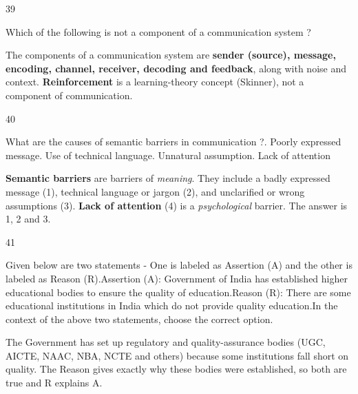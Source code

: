 \begin{question}{39}
{Which of the following is not a component of a communication system ?\par}
\begin{explain}
The components of a communication system are \textbf{sender (source), message, encoding, channel, receiver, decoding and feedback}, along with noise and context. \textbf{Reinforcement} is a learning-theory concept (Skinner), not a component of communication.
\end{explain}
\end{question}

\begin{question}{40}
{What are the causes of semantic barriers in communication ?. Poorly expressed message. Use of technical language. Unnatural assumption. Lack of attention\par}
\begin{explain}
\textbf{Semantic barriers} are barriers of \emph{meaning}. They include a badly expressed message (1), technical language or jargon (2), and unclarified or wrong assumptions (3). \textbf{Lack of attention} (4) is a \emph{psychological} barrier. The answer is 1, 2 and 3.
\end{explain}
\end{question}

\begin{question}{41}
{Given below are two statements - One is labeled as Assertion (A) and the other is labeled as Reason (R).\newline Assertion (A): Government of India has established higher educational bodies to ensure the quality of education.\newline Reason (R): There are some educational institutions in India which do not provide quality education.\newline In the context of the above two statements, choose the correct option.\par}
\begin{explain}
The Government has set up regulatory and quality-assurance bodies (UGC, AICTE, NAAC, NBA, NCTE and others) because some institutions fall short on quality. The Reason gives exactly why these bodies were established, so both are true and R explains A.
\end{explain}
\end{question}

